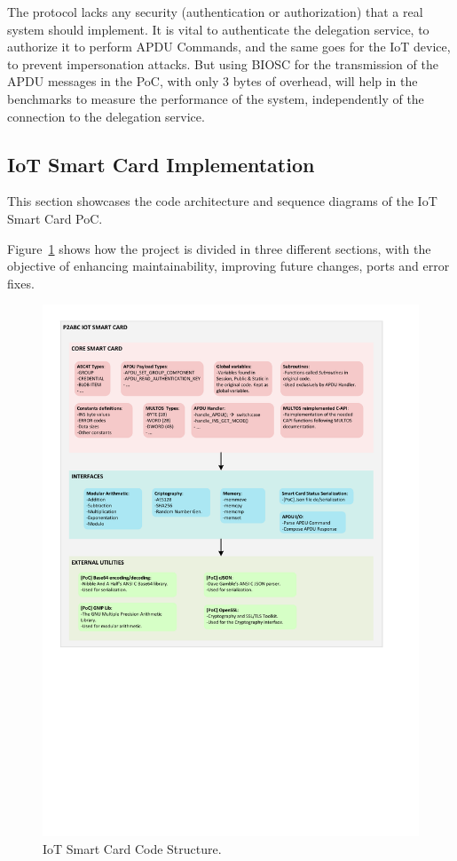 The protocol lacks any security (authentication or authorization) that a real system should implement. It is vital to authenticate the delegation service, to authorize it to perform APDU Commands, and the same goes for the IoT device, to prevent impersonation attacks. But using BIOSC for the transmission of the APDU messages in the PoC, with only 3 bytes of overhead, will help in the  benchmarks to measure the performance of the system, independently of the connection to the delegation service.


\subsection{IoT Smart Card Implementation}

This section showcases the code architecture and sequence diagrams of the IoT Smart Card PoC.

%

Figure~\ref{fig:IoTCScomponents-color} shows how the project is divided in three different sections, with the objective of enhancing maintainability, improving future changes, ports and error fixes.


\begin{figure}[bth]
	\centering
	\includegraphics[width=\linewidth]{gfx/IoTCScomponents-color}
	\caption{IoT Smart Card Code Structure.}
	\label{fig:IoTCScomponents-color}
\end{figure}



